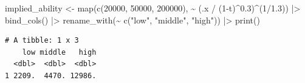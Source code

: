 \documentclass[
  letterpaper,
  DIV=11,
  numbers=noendperiod]{scrartcl}
\newenvironment{Shaded}{\begin{snugshade}}{\end{snugshade}}
\newcommand{\DecValTok}[1]{\textcolor[rgb]{0.68,0.00,0.00}{#1}}
\newcommand{\FloatTok}[1]{\textcolor[rgb]{0.68,0.00,0.00}{#1}}
\newcommand{\FunctionTok}[1]{\textcolor[rgb]{0.28,0.35,0.67}{#1}}
\newcommand{\NormalTok}[1]{\textcolor[rgb]{0.00,0.23,0.31}{#1}}
\newcommand{\OtherTok}[1]{\textcolor[rgb]{0.00,0.23,0.31}{#1}}
\newcommand{\SpecialCharTok}[1]{\textcolor[rgb]{0.37,0.37,0.37}{#1}}
\newcommand{\StringTok}[1]{\textcolor[rgb]{0.13,0.47,0.30}{#1}}
\begin{document}
\begin{Shaded}
\begin{Highlighting}[]
\NormalTok{implied\_ability }\OtherTok{\textless{}{-}} \FunctionTok{map}\NormalTok{(}\FunctionTok{c}\NormalTok{(}\DecValTok{20000}\NormalTok{, }\DecValTok{50000}\NormalTok{, }\DecValTok{200000}\NormalTok{), }\SpecialCharTok{\textasciitilde{}}\NormalTok{ (.x }\SpecialCharTok{/}\NormalTok{ (}\DecValTok{1}\SpecialCharTok{{-}}\NormalTok{t)}\SpecialCharTok{\^{}}\FloatTok{0.3}\NormalTok{)}\SpecialCharTok{\^{}}\NormalTok{(}\DecValTok{1}\SpecialCharTok{/}\FloatTok{1.3}\NormalTok{)) }\SpecialCharTok{|\textgreater{}}
  \FunctionTok{bind\_cols}\NormalTok{() }\SpecialCharTok{|\textgreater{}}
  \FunctionTok{rename\_with}\NormalTok{(}\SpecialCharTok{\textasciitilde{}} \FunctionTok{c}\NormalTok{(}\StringTok{"low"}\NormalTok{, }\StringTok{"middle"}\NormalTok{, }\StringTok{"high"}\NormalTok{)) }\SpecialCharTok{|\textgreater{}} \FunctionTok{print}\NormalTok{() }
\end{Highlighting}
\end{Shaded}

\begin{verbatim}
# A tibble: 1 x 3
    low middle   high
  <dbl>  <dbl>  <dbl>
1 2209.  4470. 12986.
\end{verbatim}
\end{document}
